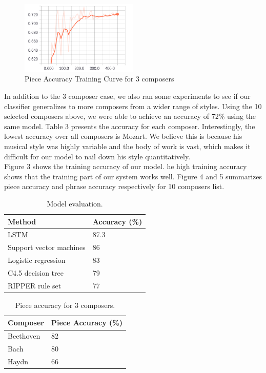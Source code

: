 \documentclass[11pt,a4paper]{article}
\begin{document}
\begin{figure}[h]
\caption{Piece Accuracy Training Curve for 3 composers}
\centering
\includegraphics[width=0.5\textwidth]{3_com_piece.png}
\end{figure}


In addition to the 3 composer case, we also ran some experiments to see if our classifier generalizes to more composers from a wider range of styles. Using the 10 selected composers above, we were able to achieve an accuracy of 72\% using the same model. Table 3 presents the accuracy for each composer. Interestingly, the lowest accuracy over all composers is Mozart. We believe this is because his musical style was highly variable and the body of work is vast, which makes it difficult for our model to nail down his style quantitatively. \\
Figure 3 shows the training accuracy of our model. he high training accuracy shows that the training part of our system works well. Figure 4 and 5 summarizes piece accuracy and phrase accuracy respectively for 10 composers list.

\begin{table}[t!]
\begin{center}
\begin{tabular}{|l|l|}
\hline \bf Method & \bf Accuracy (\%) \\ \hline
\underline{LSTM} & 87.3 \\
Support vector machines & 86 \\
Logistic regression & 83\\
C4.5 decision tree & 79\\
RIPPER rule set & 77\\
\hline
\end{tabular}
\end{center}
\caption{\label{resutls-table} Model evaluation. }
\end{table}


\begin{table}[t!]
\begin{center}
\begin{tabular}{|l|l|}
\hline \bf Composer & \bf Piece Accuracy (\%) \\ \hline

Beethoven & 82 \\
Bach & 80\\
Haydn & 66\\

\hline
\end{tabular}
\end{center}
\caption{\label{resutls-table} Piece accuracy for 3 composers. }
\end{table}
\end{document}
